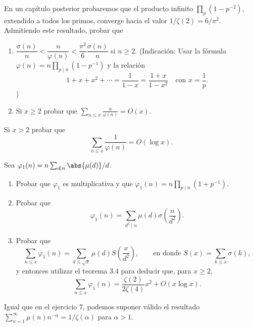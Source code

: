 \documentclass[12pt,a4paper]{book}
\begin{document}
    \begin{ejercicio}
        En un capítulo posterior probaremos que el producto infinito $\prod_{p}(1-p^{-2})$,
        extendido a todos los primos, converge hacia el valor $1/\zeta(2)=6/\pi^{2}$.
        Admitiendo este resultado, probar que
        \begin{enumerate}
            \item[(a)] $\dfrac{\sigma(n)}{n}<\dfrac{n}{\varphi(n)}<\dfrac{\pi^{2}}{6}\dfrac{\sigma(n)}{n}$
            si $n\geq2$. (Indicación: Usar la fórmula $\varphi(n)=n\prod_{p\mid n}(1-p^{-1})$
            y la relación
            \begin{equation*}
                1+x+x^{2}+\cdots=\frac{1}{1-x}=\frac{1+x}{1-x^{2}}\quad\text{con } x=\frac{1}{p}.
            \end{equation*})
            \item[(b)] Si $x\geq2$ probar que $\displaystyle\sum_{n\leq x}\frac{n}{\varphi(n)}=O(x)$.
        \end{enumerate}
    \end{ejercicio}

    \begin{ejercicio}
        Si $x>2$ probar que
        \begin{equation*}
            \sum_{n\leq x}\frac{1}{\varphi(n)}=O(\log x).
        \end{equation*}
    \end{ejercicio}

    \begin{ejercicio}
        Sea $\varphi_{1}(n)=n\sum_{d\mid n}\abs{\mu(d)}/d$.
        \begin{enumerate}
            \item[(a)] Probar que $\varphi_{1}$ es multiplicativa y que
            $\varphi_{1}(n)=n\prod_{p\mid n}(1+p^{-1})$.
            \item[(b)] Probar que
            \begin{equation*}
                \varphi_{1}(n)=\sum_{d^{2}\mid n}\mu(d)\sigma\left(\frac{n}{d^{2}}\right).
            \end{equation*}
            \item[(c)] Probar que
            \begin{equation*}
                \sum_{n\leq x}\varphi_{1}(n)=\sum_{d\leq\sqrt{x}}\mu(d)S\left(\frac{x}{d^{2}}\right),
                \qquad\text{en donde } S(x)=\sum_{k\leq x}\sigma(k),
            \end{equation*}
            y entonces utilizar el teorema 3.4 para deducir que, para $x\geq2$,
            \begin{equation*}
                \sum_{n\leq x}\varphi_{1}(n)=\frac{\zeta(2)}{2\zeta(4)}x^{2}+O(x\log x).
            \end{equation*}
        \end{enumerate}
        Igual que en el ejercicio 7, podemos suponer válido el resultado
        $\sum_{n=1}^{\infty}\mu(n)n^{-\alpha}=1/\zeta(\alpha)$ para $\alpha>1$.
    \end{ejercicio}
\end{document}
